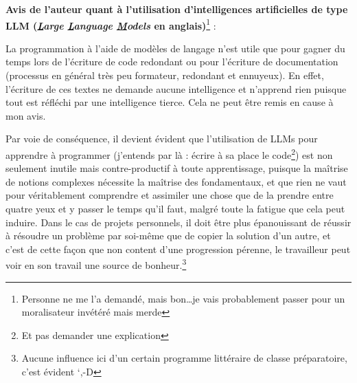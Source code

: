 \documentclass[../../../main.tex]{subfiles}
\begin{document}
\textbf{Avis de l'auteur quant à l'utilisation d'intelligences artificielles de type LLM (\textit{\underline{L}arge \underline{L}anguage \underline{M}odels} en anglais)}\footnote{Personne ne me l'a demandé, mais bon\dots je vais probablement passer pour un moralisateur invétéré mais merde} :
 
La programmation à l'aide de modèles de langage n'est utile que pour gagner du temps lors de l'écriture de code redondant ou pour l'écriture de documentation (processus en général très peu formateur, redondant et ennuyeux). En effet, l'écriture de ces textes ne demande aucune intelligence et n'apprend rien puisque tout est réfléchi par une intelligence tierce. Cela ne peut être remis en cause à mon avis.
 
Par voie de conséquence, il devient évident que l'utilisation de LLMs pour apprendre à programmer (j'entends par là : écrire à sa place le code\footnote{Et pas demander une explication}) est non seulement inutile mais contre-productif à toute apprentissage, puisque la maîtrise de notions complexes nécessite la maîtrise des fondamentaux, et que rien ne vaut pour véritablement comprendre et assimiler une chose que de la prendre entre quatre yeux et y passer le temps qu'il faut, malgré toute la fatigue que cela peut induire. Dans le cas de projets personnels, il doit être plus épanouissant de réussir à résoudre un problème par soi-même que de copier la solution d'un autre, et c'est de cette façon que non content d'une progression pérenne, le travailleur peut voir en son travail une source de bonheur.\footnote{Aucune influence ici d'un certain programme littéraire de classe préparatoire, c'est évident `,-D}
 
\end{document}
